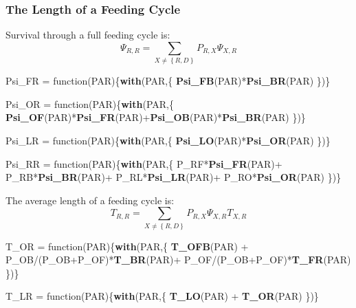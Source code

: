 \documentclass[]{article}
\newenvironment{Shaded}{\begin{snugshade}}{\end{snugshade}}
\newcommand{\KeywordTok}[1]{\textcolor[rgb]{0.13,0.29,0.53}{\textbf{{#1}}}}
\newcommand{\StringTok}[1]{\textcolor[rgb]{0.31,0.60,0.02}{{#1}}}
\newcommand{\NormalTok}[1]{{#1}}
\begin{document}
\subsubsection{The Length of a Feeding
Cycle}\label{the-length-of-a-feeding-cycle}

Survival through a full feeding cycle is:
\[\Psi_{R,R} = \sum_{X \neq \left\{R,D\right\}} P_{R,X} \Psi_{X,R}\]

\begin{Shaded}
\begin{Highlighting}[]
\NormalTok{Psi_FR =}\StringTok{ }\NormalTok{function(PAR)\{}\KeywordTok{with}\NormalTok{(PAR,\{}
  \KeywordTok{Psi_FB}\NormalTok{(PAR)*}\KeywordTok{Psi_BR}\NormalTok{(PAR)}
\NormalTok{\})\} }

\NormalTok{Psi_OR =}\StringTok{ }\NormalTok{function(PAR)\{}\KeywordTok{with}\NormalTok{(PAR,\{}
  \KeywordTok{Psi_OF}\NormalTok{(PAR)*}\KeywordTok{Psi_FR}\NormalTok{(PAR)+}\KeywordTok{Psi_OB}\NormalTok{(PAR)*}\KeywordTok{Psi_BR}\NormalTok{(PAR)}
\NormalTok{\})\}}

\NormalTok{Psi_LR =}\StringTok{ }\NormalTok{function(PAR)\{}\KeywordTok{with}\NormalTok{(PAR,\{}
  \KeywordTok{Psi_LO}\NormalTok{(PAR)*}\KeywordTok{Psi_OR}\NormalTok{(PAR)}
\NormalTok{\})\}}

\NormalTok{Psi_RR =}\StringTok{ }\NormalTok{function(PAR)\{}\KeywordTok{with}\NormalTok{(PAR,\{}
  \NormalTok{P_RF*}\KeywordTok{Psi_FR}\NormalTok{(PAR)+}
\StringTok{  }\NormalTok{P_RB*}\KeywordTok{Psi_BR}\NormalTok{(PAR)+}
\StringTok{  }\NormalTok{P_RL*}\KeywordTok{Psi_LR}\NormalTok{(PAR)+}
\StringTok{  }\NormalTok{P_RO*}\KeywordTok{Psi_OR}\NormalTok{(PAR)}
\NormalTok{\})\}}
\end{Highlighting}
\end{Shaded}

The average length of a feeding cycle is:
\[T_{R,R} = \sum_{X \neq \left\{R,D\right\}} P_{R,X} \Psi_{X,R} T_{X,R} \]

\begin{Shaded}
\begin{Highlighting}[]
\NormalTok{T_OR =}\StringTok{ }\NormalTok{function(PAR)\{}\KeywordTok{with}\NormalTok{(PAR,\{}
  \KeywordTok{T_OFB}\NormalTok{(PAR) +}\StringTok{ }\NormalTok{P_OB/(P_OB+P_OF)*}\KeywordTok{T_BR}\NormalTok{(PAR)+}\StringTok{ }\NormalTok{P_OF/(P_OB+P_OF)*}\KeywordTok{T_FR}\NormalTok{(PAR)}
\NormalTok{\})\}}

\NormalTok{T_LR =}\StringTok{ }\NormalTok{function(PAR)\{}\KeywordTok{with}\NormalTok{(PAR,\{}
  \KeywordTok{T_LO}\NormalTok{(PAR) +}\StringTok{ }\KeywordTok{T_OR}\NormalTok{(PAR)}
\NormalTok{\})\}}
\end{Highlighting}
\end{Shaded}
\end{document}
